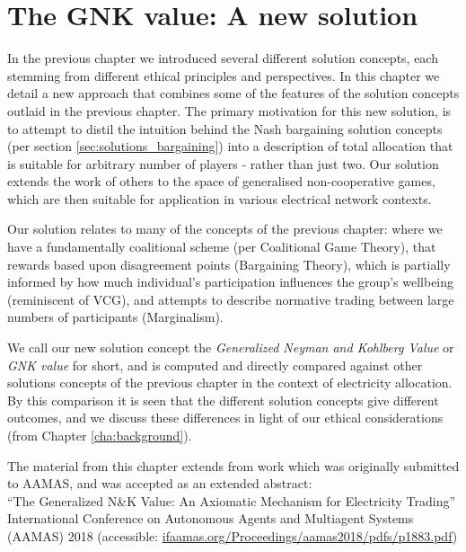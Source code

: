 \chapter{The GNK value: A new solution}
\label{cha:new_solution}

In the previous chapter we introduced several different solution concepts, each stemming from different ethical principles and perspectives.
In this chapter we detail a new approach that combines some of the features of the solution concepts outlaid in the previous chapter.
The primary motivation for this new solution, is to attempt to distil the intuition behind the Nash bargaining solution concepts (per section \ref{sec:solutions_bargaining}) into a description of total allocation that is suitable for arbitrary number of players - rather than just two.
Our solution extends the work of others to the space of generalised non-cooperative games, which are then suitable for application in various electrical network contexts.

Our solution relates to many of the concepts of the previous chapter: where we have a fundamentally coalitional scheme (per Coalitional Game Theory), that rewards based upon disagreement points (Bargaining Theory), which is partially informed by how much individual's participation influences the group's wellbeing (reminiscent of VCG), and attempts to describe normative trading between large numbers of participants (Marginalism).

We call our new solution concept the \textit{Generalized Neyman and Kohlberg Value} or \textit{GNK value} for short, and is computed and directly compared against other solutions concepts of the previous chapter in the context of electricity allocation.
By this comparison it is seen that the different solution concepts give different outcomes, and we discuss these differences in light of our ethical considerations (from Chapter \ref{cha:background}).

The material from this chapter extends from work which was originally submitted to AAMAS, and was accepted as an extended abstract: \\
\-\hspace{5mm}``The Generalized N\&K Value: An Axiomatic Mechanism for Electricity Trading''\\ International Conference on Autonomous Agents and Multiagent Systems\\ (AAMAS) 2018 (accessible: \href{ifaamas.org/Proceedings/aamas2018/pdfs/p1883.pdf}{ifaamas.org/Proceedings/aamas2018/pdfs/p1883.pdf})


